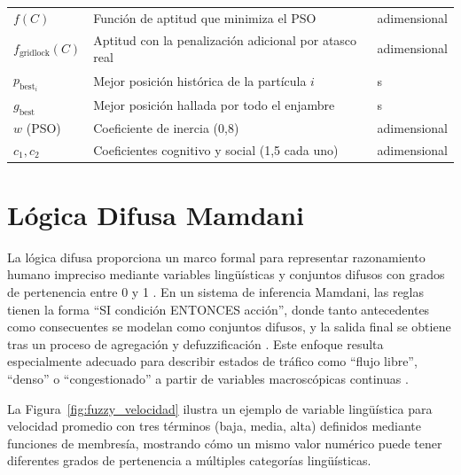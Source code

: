 \begin{table}[htbp]
\begin{tabular}{lll}
$f(C)$ & Función de aptitud que minimiza el PSO & adimensional \\
$f_{\text{gridlock}}(C)$ & Aptitud con la penalización adicional por atasco real & adimensional \\
$p_{\text{best}_i}$ & Mejor posición histórica de la partícula $i$ & s \\
$g_{\text{best}}$ & Mejor posición hallada por todo el enjambre & s \\
$w$ (PSO) & Coeficiente de inercia (0,8) & adimensional \\
$c_1, c_2$ & Coeficientes cognitivo y social (1,5 cada uno) & adimensional \\
\hline
\end{tabular}
\end{table}

\section{Lógica Difusa Mamdani}
\label{subsec:fuzzy_traffic_sync}

La lógica difusa proporciona un marco formal para representar razonamiento humano impreciso mediante variables lingüísticas y conjuntos difusos con grados de pertenencia entre 0 y 1 \cite{zadeh1965fuzzy,zadeh1971similarity}. En un sistema de inferencia Mamdani, las reglas tienen la forma ``SI condición ENTONCES acción'', donde tanto antecedentes como consecuentes se modelan como conjuntos difusos, y la salida final se obtiene tras un proceso de agregación y defuzzificación \cite{mamdani1975experiment,ross2010fuzzy}. Este enfoque resulta especialmente adecuado para describir estados de tráfico como ``flujo libre'', ``denso'' o ``congestionado'' a partir de variables macroscópicas continuas \cite{erdinc2023application,musriroh2020application}.

La Figura~\ref{fig:fuzzy_velocidad} ilustra un ejemplo de variable lingüística para velocidad promedio con tres términos (baja, media, alta) definidos mediante funciones de membresía, mostrando cómo un mismo valor numérico puede tener diferentes grados de pertenencia a múltiples categorías lingüísticas.

